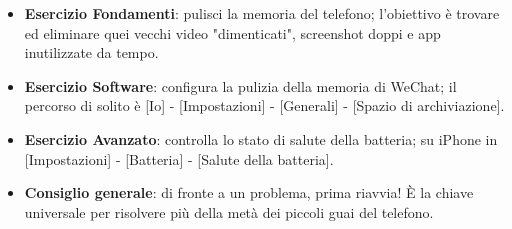
\begin{itemize}
  \item \textbf{Esercizio Fondamenti}: pulisci la memoria del telefono; l'obiettivo è trovare ed eliminare quei vecchi video "dimenticati", screenshot doppi e app inutilizzate da tempo.
  \item \textbf{Esercizio Software}: configura la pulizia della memoria di WeChat; il percorso di solito è [Io] - [Impostazioni] - [Generali] - [Spazio di archiviazione].
  \item \textbf{Esercizio Avanzato}: controlla lo stato di salute della batteria; su iPhone in [Impostazioni] - [Batteria] - [Salute della batteria].
  \item \textbf{Consiglio generale}: di fronte a un problema, prima riavvia! È la chiave universale per risolvere più della metà dei piccoli guai del telefono.
\end{itemize}
